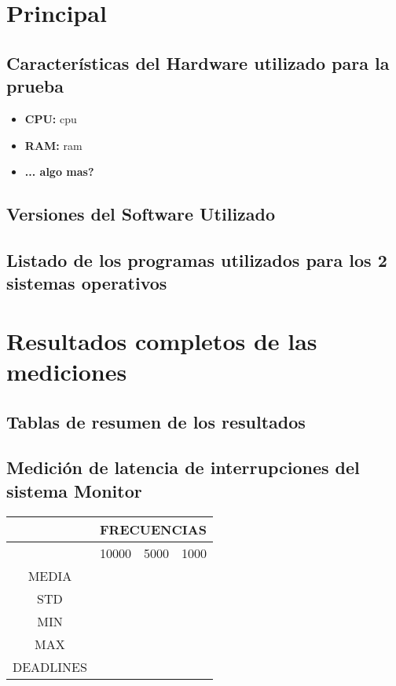 \section{Principal}


\subsection{Características del Hardware utilizado para la prueba}
\begin{itemize}
\item \textbf{CPU:} cpu
\item \textbf{RAM:} ram
\item \textbf{... algo mas?}
\end{itemize}

\subsection{Versiones del Software Utilizado}

\subsection{Listado de los programas utilizados para los 2 sistemas operativos}

\section{Resultados completos de las mediciones}

\subsection{Tablas de resumen de los resultados}


\subsection{Medición de latencia de interrupciones del sistema Monitor}
\begin{tabular}{|c|c|c|c|}
\hline
&\multicolumn{3}{|c|}{FRECUENCIAS}\\
\hline
&10000&5000&1000\\
\hline
MEDIA&&&\\
\hline
STD&&&\\
\hline
MIN&&&\\
\hline
MAX&&&\\
\hline
DEADLINES&&&\\
\hline
\end{tabular}



